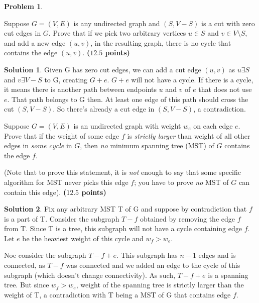 \documentclass{article}
\theoremstyle{definition}
\newtheorem{problem}{Problem}
\newtheorem*{solution*}{Solution}
\newenvironment{solution}{\begin{solution*}}{{} \end{solution*}}
\newcommand{\grade}[1]{\hfill{\textbf{($\mathbf{#1}$ points)}}}
\begin{document}
\begin{problem}\label{basics}~
\begin{enumerate}[label=(\alph*)]
	\item Suppose $G=(V,E)$ is any undirected graph and $(S,V-S)$ is a cut with zero cut edges in $G$. Prove that if we pick two arbitrary vertices $u \in S$ and $v \in V \setminus S$, and add a new edge $(u,v)$, in the resulting graph, there is no cycle that contains the edge $(u,v)$. 
	\grade{12.5}

\begin{solution}
	\item Given G has zero cut edges, we can add a cut edge $(u, v)$ as $u \exists S$ and $v \exists {V-S}$ to G, creating $G + e$.  $G + e$ will not have a cycle. If there is a cycle, it means there is another path between endpoints $u$ and $v$ of $e$ that does not use $e$. That path belongs to G then. At least one edge of this path should cross the cut $(S, V-S)$. So there's already a cut edge in $(S, V-S)$, a contradiction. 
\end{solution}

	\newpage
	\item Suppose $G = (V,E)$ is an undirected graph with weight $w_e$ on each edge $e$. Prove that if the weight of some edge $f$ is \emph{strictly larger} than weight of  all other edges in \emph{some cycle} in $G$, then \emph{no} minimum spanning tree (MST) of $G$ contains the edge $f$. 
	
	(Note that to prove this statement, it is \emph{not} enough
	to say that some specific algorithm for MST never picks this edge $f$; you have to prove \emph{no} MST of $G$ can contain this edge). 
	 \grade{12.5}
	
	
\begin{solution}
	\item Fix any arbitrary MST T of G and suppose by contradiction that $f$ is a part of T. Consider the subgraph $T - f$ obtained by removing the edge $f$ from T. Since T is a tree, this subgraph will not have a cycle containing edge $f$. Let $e$ be the heaviest weight of this cycle and $w_f > w_e$.
	\item Noe consider the subgraph $T - f + e$. This subgraph has $n - 1$ edges and is connected, as $T - f$ was connected and we added an edge to the cycle of this subgraph (which doesn't change connectivity). As such, $T - f + e$ is a spanning tree. But since $w_f > w_e$, weight of the spanning tree is strictly larger than the weight of T, a contradiction with T being a MST of G that contains edge $f$.  
\end{solution}
 
	
\end{enumerate}
\end{problem}
\end{document}
